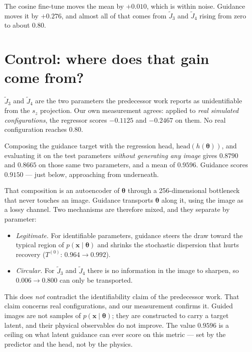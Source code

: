 \documentclass[11pt,a4paper]{article}
\begin{document}
The cosine fine-tune moves the mean by $+0.010$, which is within noise. Guidance moves
it by $+0.276$, and almost all of that comes from $\tilde{J}_{3}$ and $\tilde{J}_{4}$
rising from zero to about $0.80$.

\section{Control: where does that gain come from?}\label{sec:control}

$\tilde{J}_{3}$ and $\tilde{J}_{4}$ are the two parameters the predecessor work reports
as unidentifiable from the $s_z$ projection. Our own measurement agrees: applied to
\emph{real simulated configurations}, the regressor scores $-0.1125$ and $-0.2467$ on
them. No real configuration reaches $0.80$.

Composing the guidance target with the regression head, $\mathrm{head}(h(\bm\theta))$,
and evaluating it on the test parameters \emph{without generating any image} gives
$0.8790$ and $0.8665$ on those same two parameters, and a mean of $0.9596$. Guidance
scores $0.9150$ --- just below, approaching from underneath.

That composition is an autoencoder of $\bm\theta$ through a 256-dimensional bottleneck
that never touches an image. Guidance transports $\bm\theta$ along it, using the image
as a lossy channel. Two mechanisms are therefore mixed, and they separate by parameter:

\begin{itemize}
  \item \emph{Legitimate.} For identifiable parameters, guidance steers the draw toward
        the typical region of $p(\mathbf{x}\mid\bm\theta)$ and shrinks the stochastic
        dispersion that hurts recovery ($T^{(0)}$: $0.964\to0.992$).
  \item \emph{Circular.} For $\tilde{J}_{3}$ and $\tilde{J}_{4}$ there is no information
        in the image to sharpen, so $0.006\to0.800$ can only be transported.
\end{itemize}

This does \emph{not} contradict the identifiability claim of the predecessor work. That
claim concerns real configurations, and our measurement confirms it. Guided images are
not samples of $p(\mathbf{x}\mid\bm\theta)$; they are constructed to carry a target
latent, and their physical observables do not improve. The value $0.9596$ is a ceiling
on what latent guidance can ever score on this metric --- set by the predictor and the
head, not by the physics.
\end{document}
